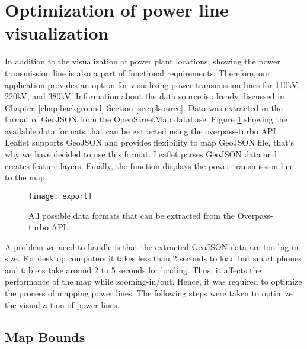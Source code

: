 \section{Optimization of power line visualization}
\label{sec:powerLine}

In addition to the visualization of power plant locations, showing the power transmission line is also a part of functional requirements. Therefore, our application provides an option for visualizing power transmission lines for 110kV, 220kV, and 380kV. Information about the data source is already discussed in Chapter~\ref{chap:background} Section \ref{sec:plsource}. Data was extracted in the format of GeoJSON from the OpenStreetMap database. Figure \ref{fig:export} showing the available data formats that can be extracted using the overpass-turbo API. Leaflet supports GeoJSON and provides flexibility to map GeoJSON file, that's why we have decided to use this format. Leaflet parses GeoJSON data and creates feature layers. Finally, the function displays the power transmission line to the map.

\begin{figure}
\centering
\texttt{[image: export]}
\caption{All possible data formats that can be extracted from the Overpass-turbo API.}
\label{fig:export}
\end{figure}

A problem we need to handle is that the extracted GeoJSON data are too big in size. For desktop computers it takes less than 2 seconds to load but smart phones and tablets take around 2 to 5 seconds for loading. Thus, it affects the performance of the map while zooming-in/out. Hence, it was required to optimize the process of mapping power lines. The following steps were taken to optimize the visualization of power lines.

\subsection{Map Bounds}

